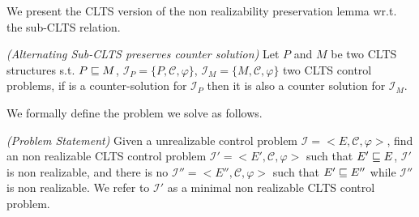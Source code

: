 We present the CLTS version of the non realizability preservation lemma wr.t. the sub-CLTS relation.

\begin{lemma}\emph{(Alternating Sub-CLTS preserves counter solution)}\label{theorem:sub_clts_preserves-non-realizability}
Let $P$ and $M$ be two CLTS structures s.t. $P \sqsubseteq M$, 
$\mathcal{I}_P = \lbrace P, \mathcal{C}, \varphi \rbrace$,
$\mathcal{I}_M = \lbrace M, \mathcal{C}, \varphi \rbrace$
two CLTS control problems, if
 \advCtrl is a counter-solution for $\mathcal{I}_P$ then it is also a counter solution for $\mathcal{I}_M$.
\end{lemma}

We formally define the problem we solve as follows.

\begin{definition}\label{def:ProblemStatement}\emph{(Problem Statement)}
Given a unrealizable control problem $\mathcal{I} = <E, \mathcal{C}, \varphi>$, find an non realizable CLTS control problem $\mathcal{I'} = <E', \mathcal{C}, \varphi>$ such that $E' \sqsubseteq E$, $\mathcal{I'}$ is non realizable, and there is no $\mathcal{I''} = <E'', \mathcal{C}, \varphi>$ such that $E' \sqsubseteq E''$ while $\mathcal{I''}$ is non realizable. We refer to $\mathcal{I'}$ as a minimal non realizable CLTS control problem.
\end{definition}

